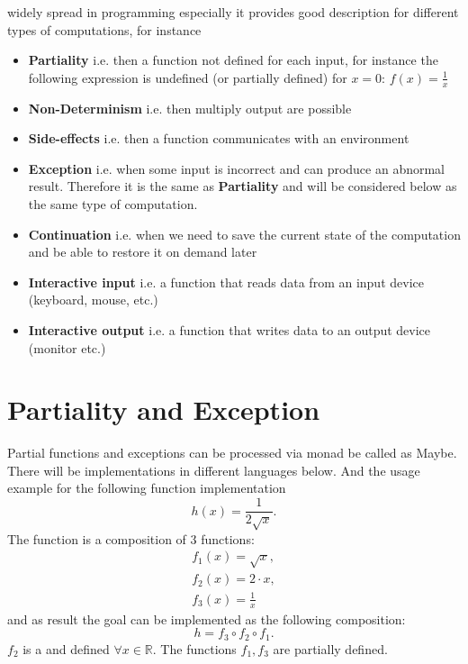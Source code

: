  widely spread in programming
especially it provides good description for different types of
computations, for instance \cite{bib:Moggi91, bib:milewski2018category} 
\begin{itemize}
\item \textbf{Partiality} i.e. then a function not defined for each input, for
  instance the following expression is undefined (or partially
  defined) for $x = 0$: $f(x) = \frac{1}{x}$
\item \textbf{Non-Determinism} i.e. then multiply output are possible
\item \textbf{Side-effects} i.e. then a function communicates with
  an environment
\item \textbf{Exception} i.e. when some input is incorrect and can
  produce an abnormal result. Therefore it is the same as
  \textbf{Partiality} and will be considered below as the same type of
  computation. 
\item \textbf{Continuation} i.e. when we need to save the current
  state of the computation and be able to restore it on demand later
\item \textbf{Interactive input} i.e. a function that reads data from
  an input device (keyboard, mouse, etc.)
\item \textbf{Interactive output} i.e. a function that writes data to
an output device (monitor etc.)
\end{itemize}

\section{Partiality and Exception}

Partial functions and exceptions can be processed via monad be called
as Maybe. There will be implementations in different languages below.
And the usage example for the following function implementation
\[
h(x) = \frac{1}{2 \sqrt{x}}.
\]
The function is a composition of 3 functions:
\begin{eqnarray}
f_1(x) = \sqrt{x},
\nonumber \\
f_2(x) = 2 \cdot x,
\nonumber \\
f_3(x) = \frac{1}{x}
\label{eq:monadmaybe_ex_f}
\end{eqnarray}
and as result the goal can be implemented as the following
composition:
\begin{equation}
h = f_3 \circ f_2 \circ f_1.
\label{eq:monadmaybe_ex_h}
\end{equation}
$f_2$ is a  and defined $\forall x \in \mathbb{R}$. The
functions $f_1, f_3$ are partially defined.

